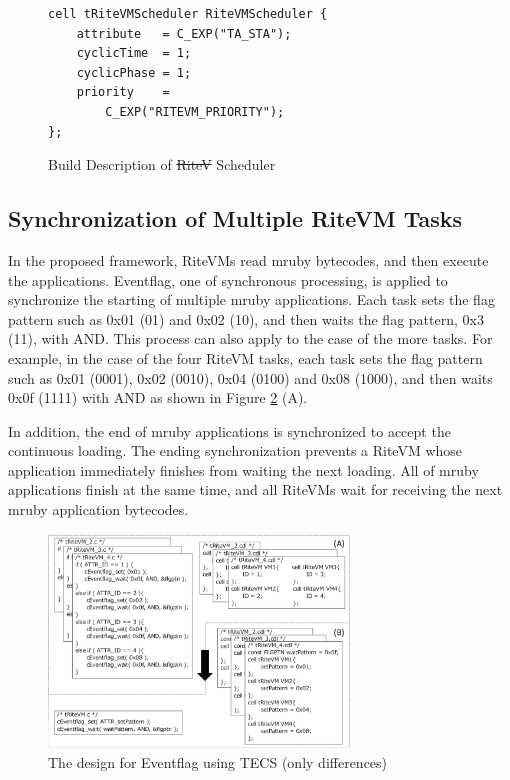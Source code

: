 \documentclass{sig-alternate-05-2015}
\providecommand{\DIFadd}[1]{{\protect\color{blue}\uwave{#1}}} %
\providecommand{\DIFdel}[1]{{\protect\color{red}\sout{#1}}}                      %
\providecommand{\DIFaddFL}[1]{\DIFadd{#1}} %
\providecommand{\DIFdelFL}[1]{\DIFdel{#1}} %
\providecommand{\DIFaddbeginFL}{} %
\providecommand{\DIFaddendFL}{} %
\providecommand{\DIFdelbeginFL}{} %
\providecommand{\DIFdelendFL}{} %
\begin{document}
\begin{figure}[t]
    \centering
    \begin{lstlisting}
cell tRiteVMScheduler RiteVMScheduler {
    attribute   = C_EXP("TA_STA");
    cyclicTime  = 1;
    cyclicPhase = 1;
    priority    =
        C_EXP("RITEVM_PRIORITY");
};
\end{lstlisting}
    \vspace{1mm}
\caption{Build Description of \DIFdelbeginFL \DIFdelFL{RiteV }\DIFdelendFL \DIFaddbeginFL \DIFaddFL{RiteVM }\DIFaddendFL Scheduler}
    \vspace{1mm}
\label{build_cyclic_handler}
\end{figure}

\subsection{Synchronization of Multiple RiteVM Tasks}
In the proposed framework, RiteVMs read mruby bytecodes, and then execute the applications.
Eventflag, one of synchronous processing, is applied to synchronize the starting of multiple mruby applications.
Each task sets the flag pattern such as 0x01 (01) and 0x02 (10), and then waits the flag pattern, 0x3 (11), with AND.
This process can also apply to the case of the more tasks.
For example, in the case of the four RiteVM tasks, each task sets the flag pattern such as 0x01 (0001), 0x02 (0010), 0x04 (0100)  and 0x08 (1000), and then waits 0x0f (1111) with AND as shown in Figure \ref{fig:Eventflag} (A).

In addition, the end of mruby applications is synchronized to accept the continuous loading.
The ending synchronization prevents a RiteVM whose application immediately finishes from waiting the next loading.
All of mruby applications finish at the same time, and all RiteVMs wait for receiving the next mruby application bytecodes. 

\begin{figure}[t]
    \centering
    \includegraphics[width=8cm,clip]{figure/Eventflag.eps}
    \vspace{1mm}
\caption{The design for Eventflag using TECS (only differences)}
    \vspace{1mm}
\label{fig:Eventflag}
\end{figure}
\end{document}
